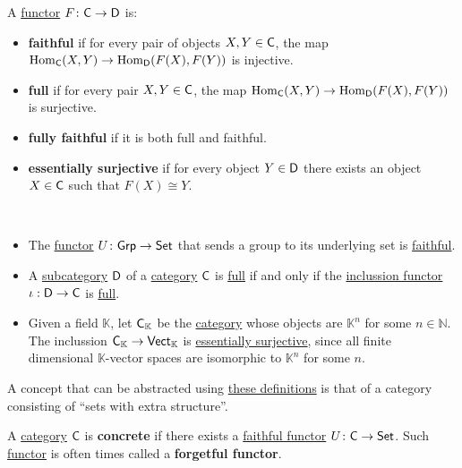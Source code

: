 \documentclass[../../main]{subfiles}
\begin{document}
\begin{definition}\label{def:functor-types}
  A \hyperref[def:functor]{functor} \(F\colon \mathsf{C} \to \mathsf{D}\) is:
  \begin{itemize}
    \item \textbf{faithful} if for every pair of objects \(X, Y \in \mathsf{C}\), the map \(\operatorname{Hom}_{\mathsf{C}}(X, Y) \to \operatorname{Hom}_{\mathsf{D}}(F(X), F(Y))\) is injective.
    \item \textbf{full} if for every pair \(X, Y \in \mathsf{C}\), the map \(\operatorname{Hom}_{\mathsf{C}}(X, Y) \to \operatorname{Hom}_{\mathsf{D}}(F(X), F(Y))\) is surjective.
    \item \textbf{fully faithful} if it is both full and faithful.
    \item \textbf{essentially surjective} if for every object \(Y \in \mathsf{D}\) there exists an object \(X \in \mathsf{C}\) such that \(F(X) \cong Y\).
  \end{itemize}
\end{definition}

\begin{example}~
  \begin{itemize}
    \item The \hyperref[def:functor]{functor} \(U\colon \mathsf{Grp} \to \mathsf{Set}\) that sends a group to its underlying set is \hyperref[def:functor-types]{faithful}.
    \item A \hyperref[def:subcategory]{subcategory} \(\mathsf{D}\) of a \hyperref[def:category]{category} \(\mathsf{C}\) is \hyperref[def:subcategory]{full} if and only if the \hyperref[ex:inclussion-functor]{inclussion functor} \(\iota: \mathsf{D} \to \mathsf{C}\) is \hyperref[def:functor-types]{full}.
    \item Given a field \(\mathbb{K}\), let \(\mathsf{C}_{\mathbb{K}}\) be the \hyperref[def:category]{category} whose objects are \(\mathbb{K}^{n}\) for some \(n \in \mathbb{N}\).
          The inclussion \(\mathsf{C}_{\mathbb{K}} \to \mathsf{Vect}_{\mathbb{K}}\) is \hyperref[def:functor-types]{essentially surjective}, since all finite dimensional \(\mathbb{K}\)-vector spaces are isomorphic to \(\mathbb{K}^{n}\) for some \(n\).
  \end{itemize}
\end{example}

A concept that can be abstracted using \hyperref[def:functor-types]{these definitions} is that of a category consisting of ``sets with extra structure''.
\begin{definition}\label{def:concrete-category}
  A \hyperref[def:category]{category} \(\mathsf{C}\) is \textbf{concrete} if there exists a \hyperref[def:functor-types]{faithful functor} \(U\colon \mathsf{C} \to \mathsf{Set}\).
  Such \hyperref[def:functor]{functor} is often times called a \textbf{forgetful functor}.
\end{definition}
\end{document}
